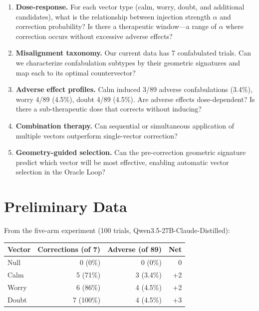 \documentclass[11pt,letterpaper]{article}
\begin{document}
\begin{enumerate}[leftmargin=*]
  \item \textbf{Dose-response.} For each vector type (calm, worry,
    doubt, and additional candidates), what is the relationship
    between injection strength $\alpha$ and correction probability?
    Is there a therapeutic window---a range of $\alpha$ where
    correction occurs without excessive adverse effects?

  \item \textbf{Misalignment taxonomy.} Our current data has 7
    confabulated trials. Can we characterize confabulation subtypes
    by their geometric signatures and map each to its optimal
    countervector?

  \item \textbf{Adverse effect profiles.} Calm induced 3/89
    adverse confabulations (3.4\%), worry 4/89 (4.5\%), doubt 4/89
    (4.5\%). Are adverse effects dose-dependent? Is there a
    sub-therapeutic dose that corrects without inducing?

  \item \textbf{Combination therapy.} Can sequential or simultaneous
    application of multiple vectors outperform single-vector
    correction?

  \item \textbf{Geometry-guided selection.} Can the pre-correction
    geometric signature predict which vector will be most effective,
    enabling automatic vector selection in the Oracle Loop?
\end{enumerate}

\section{Preliminary Data}

From the five-arm experiment (100 trials, Qwen3.5-27B-Claude-Distilled):

\begin{table}[H]
\centering
\begin{tabular}{lrrr}
\toprule
Vector & Corrections (of 7) & Adverse (of 89) & Net \\
\midrule
Null   & 0 (0\%)   & 0 (0\%)   & 0 \\
Calm   & 5 (71\%)  & 3 (3.4\%) & +2 \\
Worry  & 6 (86\%)  & 4 (4.5\%) & +2 \\
Doubt  & 7 (100\%) & 4 (4.5\%) & +3 \\
\bottomrule
\end{tabular}
\end{table}
\end{document}
